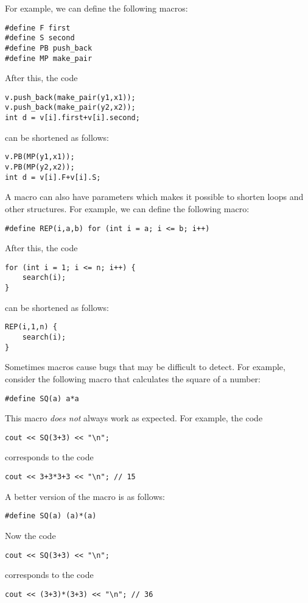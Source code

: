 For example, we can define the following macros:
\begin{lstlisting}
#define F first
#define S second
#define PB push_back
#define MP make_pair
\end{lstlisting}
After this, the code
\begin{lstlisting}
v.push_back(make_pair(y1,x1));
v.push_back(make_pair(y2,x2));
int d = v[i].first+v[i].second;
\end{lstlisting}
can be shortened as follows:
\begin{lstlisting}
v.PB(MP(y1,x1));
v.PB(MP(y2,x2));
int d = v[i].F+v[i].S;
\end{lstlisting}

A macro can also have parameters
which makes it possible to shorten loops and other
structures.
For example, we can define the following macro:
\begin{lstlisting}
#define REP(i,a,b) for (int i = a; i <= b; i++)
\end{lstlisting}
After this, the code
\begin{lstlisting}
for (int i = 1; i <= n; i++) {
    search(i);
}
\end{lstlisting}
can be shortened as follows:
\begin{lstlisting}
REP(i,1,n) {
    search(i);
}
\end{lstlisting}

Sometimes macros cause bugs that may be difficult
to detect. For example, consider the following macro
that calculates the square of a number:
\begin{lstlisting}
#define SQ(a) a*a
\end{lstlisting}
This macro \emph{does not} always work as expected.
For example, the code
\begin{lstlisting}
cout << SQ(3+3) << "\n";
\end{lstlisting}
corresponds to the code
\begin{lstlisting}
cout << 3+3*3+3 << "\n"; // 15
\end{lstlisting}

A better version of the macro is as follows:
\begin{lstlisting}
#define SQ(a) (a)*(a)
\end{lstlisting}
Now the code
\begin{lstlisting}
cout << SQ(3+3) << "\n";
\end{lstlisting}
corresponds to the code
\begin{lstlisting}
cout << (3+3)*(3+3) << "\n"; // 36
\end{lstlisting}


